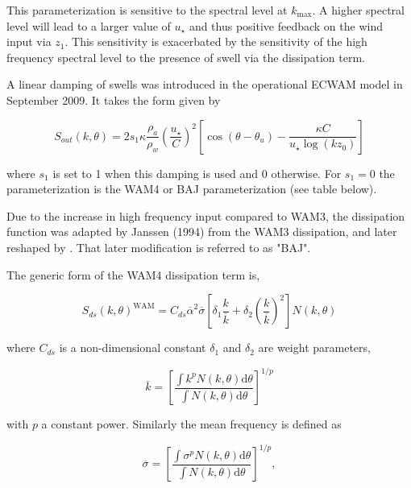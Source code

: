 \noindent
This parameterization is sensitive to the spectral level at $k_{\max}$.
A higher spectral level will lead to a larger value of $u_\star$ and thus
positive feedback on the wind input via $z_1$. This sensitivity is exacerbated
by the sensitivity of the high frequency spectral level to the presence of
swell via the dissipation term.

A linear damping of swells was introduced in the operational ECWAM model in September 2009. It takes 
the form given by \cite{bk:Jan04} 

\begin{equation}
S_{out}(k,\theta)= 2 s_1  \kappa \frac{\rho_a }{\rho_w} \left(\frac{u_\star}{C}\right)^2 
\left[\cos \left(\theta - \theta_u\right) - \frac{\kappa C}{u_\star \log(k z_0)}\right]
\end{equation}

\noindent where $s_1$ is set to 1 when this damping is used and 0 otherwise. For $s_1=0$ 
the parameterization is the WAM4 or BAJ parameterization (see table below). 

Due to the increase in high frequency input compared to WAM3, the dissipation
function was adapted by Janssen (1994) from the WAM3 dissipation, and later
reshaped by \cite{rep:Bea05}. That later modification is referred to as "BAJ".

\noindent
The generic form of the WAM4 dissipation term is,

\begin{equation}
S_{ds}\left(k,\theta\right)^{\mathrm{WAM}} = C_{ds} \overline{\alpha}^2
 \overline{\sigma} \left[\delta_1 \frac{k}{\overline{k}} + \delta_2
\left(\frac{k}{\overline{k}}\right)^2\right]\label{eq:SdsWAM4}
N\left(k,\theta\right)
\end{equation}

\noindent
where $C_{ds}$ is a non-dimensional constant $\delta_1$ and $\delta_2$ are
weight parameters,

\begin{equation}
\overline{k}=\left[\frac{\int k^p N\left(k,\theta\right) {\mathrm d}
\theta}{\int N\left(k,\theta\right) {\mathrm d} \theta}\right]^{1/p}
\end{equation}

\noindent
with $p$ a constant power. Similarly the mean frequency is defined as

\begin{equation}
\overline{\sigma}=\left[\frac{\int \sigma^p N\left(k,\theta\right) {\mathrm d}
\theta}{ \int N\left(k,\theta\right) {\mathrm d} \theta}\right]^{1/p},
\end{equation}

